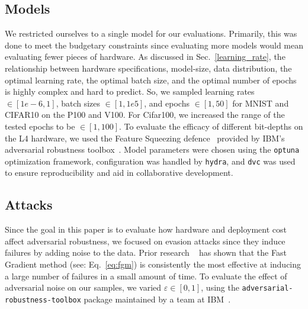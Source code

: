 \documentclass[conference]{IEEEtran}
\begin{document}
\subsection{Models}
We restricted ourselves to a single model for our evaluations. Primarily, this was done to meet the budgetary constraints since evaluating more models would mean evaluating fewer pieces of hardware. As discussed in Sec.~\ref{learning_rate}, the relationship between hardware specifications, model-size, data distribution, the optimal learning rate, the optimal batch size, and the optimal number of epochs is highly complex and hard to predict. So, we sampled learning rates $\in [1e-6, 1]$, batch sizes $\in [1, 1e5]$, and epochs $\in [1,50]$ for MNIST and CIFAR10 on the P100 and V100. For Cifar100, we increased the range of the tested epochs to be $\in [1, 100]$. To evaluate the efficacy of different bit-depths on the L4 hardware, we used the Feature Squeezing defence~\cite{feature_squeezing} provided by IBM's adversarial robustness toolbox~\cite{art2018}. Model parameters were chosen using the \texttt{optuna} optimization framework, configuration was handled by \texttt{hydra}, and \texttt{dvc} was used to ensure reproducibility and aid in collaborative development. 

\subsection{Attacks}
Since the goal in this paper is to evaluate how hardware and deployment cost affect adversarial robustness, we focused on evasion attacks since they induce failures by adding noise to the data. Prior research ~\cite{meyers} has shown that the Fast Gradient method (see: Eq.~\ref{eq:fgm}) is consistently the most effective at inducing a large number of failures in a small amount of time. To evaluate the effect of adversarial noise on our samples, we varied $\varepsilon \in [0, 1]$, using the \texttt{adversarial-robustness-toolbox} package maintained by a team at IBM~\cite{art2018}.
\end{document}
